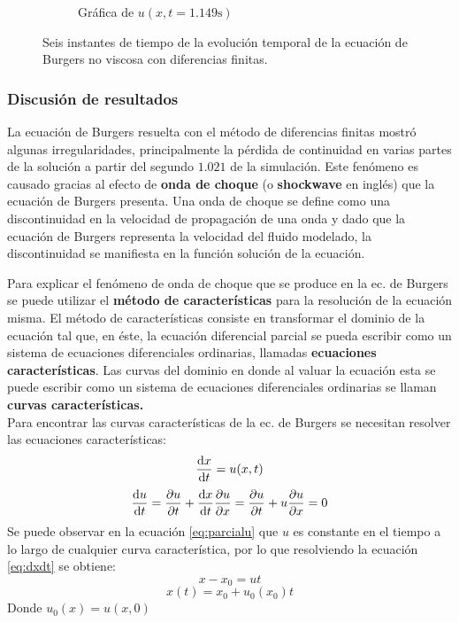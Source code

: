 \documentclass[12pt]{article}
\begin{document}
\begin{figure}[ht]
\begin{subfigure}{0.4\textwidth}
			\caption*{Gráfica de $u(x,t=1.149\unit{\second})$}
			\label{fig:b1ddf6}
		\end{subfigure}
		\caption{Seis instantes de tiempo de la evolución temporal de la ecuación de Burgers no viscosa con diferencias finitas.}
		\label{fig:instantesB1DDF}
	\end{figure}
	
	
	\subsubsection{Discusión de resultados}
	\label{sec:discusion}
	La ecuación de Burgers resuelta con el método de diferencias finitas mostró algunas irregularidades, principalmente la pérdida de continuidad en varias partes de la solución a partir del segundo $1.021$ de la simulación. Este fenómeno es causado gracias al efecto de \textbf{onda de choque}  (o \textbf{shockwave} en inglés) que la ecuación de Burgers presenta. Una onda de choque se define como una discontinuidad en la velocidad de propagación de una onda y dado que la ecuación de Burgers representa la velocidad del fluido modelado, la discontinuidad se manifiesta en la función solución de la ecuación.
	
	Para explicar el fenómeno de onda de choque que se produce en la ec. de Burgers se puede utilizar el \textbf{método de características} para la resolución de la ecuación misma. El método de características consiste en transformar el dominio de la ecuación tal que, en éste, la ecuación diferencial parcial se pueda escribir como un sistema de ecuaciones diferenciales ordinarias, llamadas \textbf{ecuaciones características}. Las curvas del dominio en donde al valuar la ecuación esta se puede escribir como un sistema de ecuaciones diferenciales ordinarias se llaman \textbf{curvas características.}\\
	Para encontrar las curvas características de la ec. de Burgers se necesitan resolver las ecuaciones características: 
	\begin{equation}
		\dv{x}{t} = u(x,t)
		\label{eq:dxdt}
	\end{equation}
	\begin{equation}
		\dv{u}{t} = \pdv{u}{t} + \dv{x}{t}\pdv{u}{x} = \pdv{u}{t}+u\pdv{u}{x} = 0
		\label{eq:parcialu}
	\end{equation}
	Se puede observar en la ecuación \ref{eq:parcialu} que $u$ es constante en el tiempo a lo largo de cualquier curva característica, por lo que resolviendo la ecuación \ref{eq:dxdt} se obtiene:
	\begin{equation}
		x-x_{0} = ut
	\end{equation}
	\begin{equation}
		x(t) = x_{0} + u_{0}(x_0)t
		\label{eq:caracteristica}
	\end{equation}
	Donde $u_0(x) = u(x,0)$
	
\end{document}
